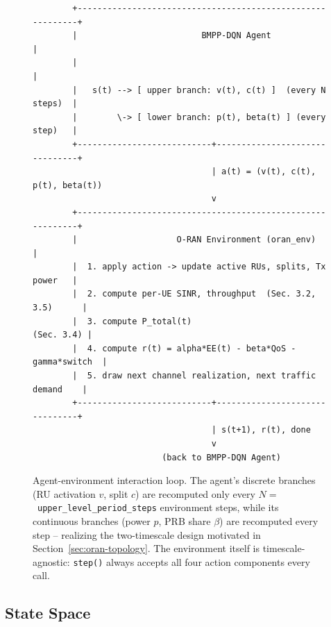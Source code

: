 \begin{figure}[htbp]
\centering
\begin{verbatim}
        +-----------------------------------------------------------+
        |                         BMPP-DQN Agent                    |
        |                                                           |
        |   s(t) --> [ upper branch: v(t), c(t) ]  (every N steps)  |
        |        \-> [ lower branch: p(t), beta(t) ] (every step)   |
        +---------------------------+-------------------------------+
                                    | a(t) = (v(t), c(t), p(t), beta(t))
                                    v
        +-----------------------------------------------------------+
        |                    O-RAN Environment (oran_env)           |
        |  1. apply action -> update active RUs, splits, Tx power   |
        |  2. compute per-UE SINR, throughput  (Sec. 3.2, 3.5)      |
        |  3. compute P_total(t)                        (Sec. 3.4) |
        |  4. compute r(t) = alpha*EE(t) - beta*QoS - gamma*switch  |
        |  5. draw next channel realization, next traffic demand    |
        +---------------------------+-------------------------------+
                                    | s(t+1), r(t), done
                                    v
                          (back to BMPP-DQN Agent)
\end{verbatim}
\caption{Agent-environment interaction loop. The agent's discrete branches
  (RU activation $v$, split $c$) are recomputed only every
  $N=$~\texttt{upper\_level\_period\_steps} environment steps, while its
  continuous branches (power $p$, PRB share $\beta$) are recomputed every
  step -- realizing the two-timescale design motivated in
  Section~\ref{sec:oran-topology}. The environment itself is
  timescale-agnostic: \texttt{step()} always accepts all four action
  components every call.}
\label{fig:oran-mdp-loop}
\end{figure}

\subsection{State Space}

